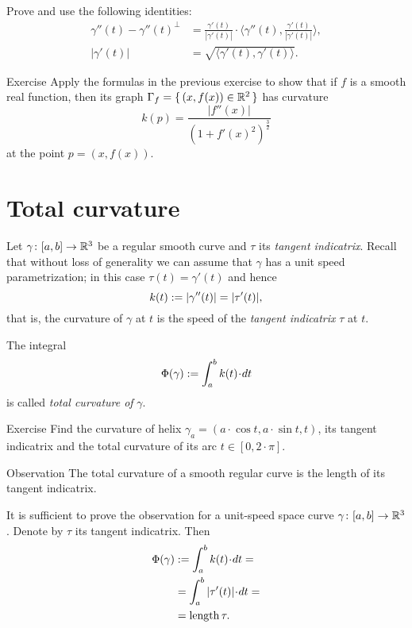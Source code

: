  Prove and use the following identities: 
\begin{align*}
\gamma''(t)-\gamma''(t)^\perp&=\tfrac{\gamma'(t)}{|\gamma'(t)|}\cdot\langle\gamma''(t),\tfrac{\gamma'(t)}{|\gamma'(t)|}\rangle,
\\
|\gamma'(t)|&=\sqrt{\langle \gamma'(t),\gamma'(t)\rangle}.\
\end{align*}


\begin{thm}{Exercise}\label{ex:curvature-graph}
Apply the formulas in the previous exercise to show that if $f$ is a smooth real function,
then its graph $\Gamma_f=\{\,(x,f(x))\z\in\RR^2\,\}$  has curvature
\[k(p)=\frac{|f''(x)|}{(1+f'(x)^2)^{\frac32}}\]
at the point $p=(x,f(x))$.
\end{thm}

\section*{Total curvature}

Let $\gamma\colon[a,b]\to\mathbb{R}^3$ be a regular smooth curve and $\tau$ its \emph{tangent indicatrix}.
Recall that without loss of generality we can assume that $\gamma$ has a unit speed parametrization;
in this case $\tau(t)=\gamma'(t)$ and hence
\[k(t):=|\gamma''(t)|=|\tau'(t)|,\] 
that is, the curvature of $\gamma$ at $t$ is the speed of the \emph{tangent indicatrix} $\tau$ at $t$.

The integral 
\[\tc\gamma:=\int_a^bk(t)\cdot dt\]
is called \emph{total curvature of} $\gamma$.

\begin{thm}{Exercise}\label{ex:helix-curvature}
Find the curvature of helix $\gamma_a=(a\cdot \cos t,a\cdot \sin t,t)$, its tangent indicatrix and the total curvature of its arc $t\in[0,2\cdot\pi]$.
\end{thm}

\begin{thm}{Observation}\label{obs:tantrix}
The total curvature of a smooth regular curve is the length of its tangent indicatrix.
\end{thm}

It is sufficient to prove the observation for a unit-speed space curve $\gamma\colon[a,b]\to\mathbb{R}^3$.
Denote by $\tau$ its tangent indicatrix.
Then
\begin{align*}
\tc\gamma&\df\int_a^bk(t)\cdot dt=
\\
&=\int_a^b|\tau'(t)|\cdot dt=
\\
&=\length\tau.
\end{align*}
\qedsf %

